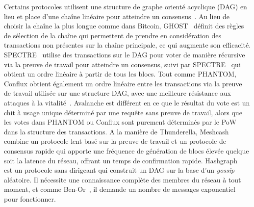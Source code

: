 {Certains protocoles utilisent une structure de graphe orienté acyclique (DAG) en lieu et place d'une chaîne linéaire
pour atteindre un consensus~\cite{SompolinskyZ15,SompolinskyLZ16,SompolinskyZ18,BentovHMN17,baird2016hashgraph}.
Au lieu de choisir la chaîne la plus longue comme dans Bitcoin, GHOST~\cite{SompolinskyZ15} définit des règles de
sélection de la chaîne qui permettent de prendre en considération des transactions non présentes sur la chaîne
principale, ce qui augmente son efficacité. SPECTRE~\cite{SompolinskyLZ16} utilise des transactions sur le DAG pour
voter de manière récursive via la preuve de travail pour atteindre un consensus, suivi par
SPECTRE~\cite{SompolinskyLZ16} qui obtient un ordre linéaire à partir de tous les blocs. Tout comme PHANTOM, Conflux
obtient également un ordre linéaire entre les transactions via la preuve de travail utilisée sur une structure DAG,
avec une meilleure résistance aux attaques à la vitalité~\cite{confluxLLXLC18}.
Avalanche est différent en ce que le résultat du vote est un chit à usage unique déterminé par une
requête sans preuve de travail, alors que les votes dans PHANTOM ou Conflux sont purement déterminés par le PoW
dans la structure des transactions. A la manière de Thunderella, Meshcash~\cite{BentovHMN17} combine un protocole
lent basé sur la preuve de travail et un protocole de consensus rapide qui apporte une fréquence de génération de blocs
élevée quelque soit la latence du réseau, offrant un temps de confirmation rapide. Hashgraph~\cite{baird2016hashgraph}
est un protocole sans dirigeant qui construit un DAG sur la base d'un \emph{gossip} aléatoire. Il nécessite une
connaissance complète des membres du réseau à tout moment, et comme Ben-Or~\cite{ben1983another}, il demande un
nombre de messages exponentiel~\cite{aspnes2003randomized,CachinV17} pour fonctionner.

}
